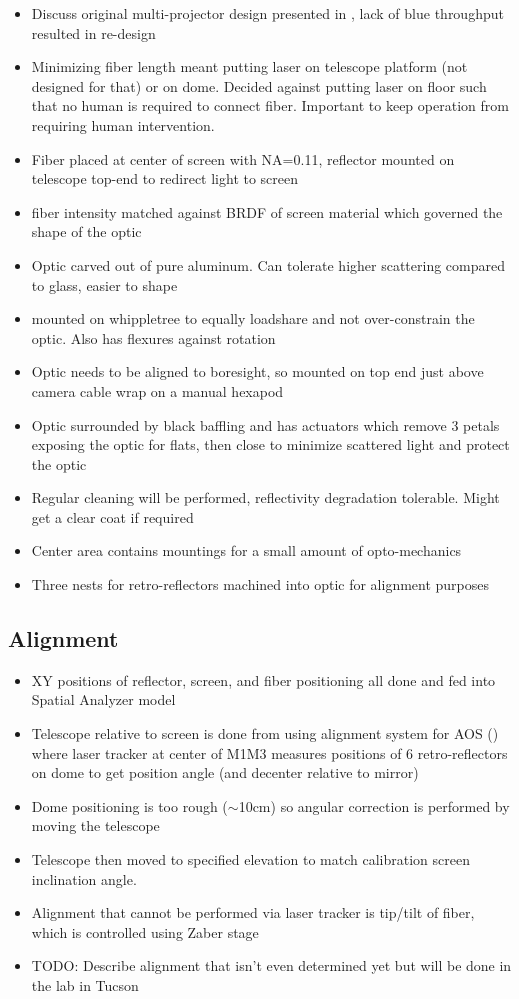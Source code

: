 \begin{itemize}
	\item Discuss original multi-projector design presented in \cite{Sebag2014}, lack of blue throughput resulted in re-design
	\item Minimizing fiber length meant putting laser on telescope platform (not designed for that) or on dome. Decided against putting laser on floor such that no human is required to connect fiber. Important to keep operation from requiring human intervention.
	\item Fiber placed at center of screen with NA=0.11, reflector mounted on telescope top-end to redirect light to screen
	\item fiber intensity matched against BRDF of screen material which governed the shape of the optic
	\item Optic carved out of pure aluminum. Can tolerate higher scattering compared to glass, easier to shape 
	\item mounted on whippletree to equally loadshare and not over-constrain the optic. Also has flexures against rotation
	\item Optic needs to be aligned to boresight, so mounted on top end just above camera cable wrap on a manual hexapod
	\item Optic surrounded by black baffling and has actuators which remove 3 petals exposing the optic for flats, then close to minimize scattered light and protect the optic
	\item Regular cleaning will be performed, reflectivity degradation tolerable. Might get a clear coat if required
	\item Center area contains mountings for a small amount of opto-mechanics 
	\item Three nests for retro-reflectors machined into optic for alignment purposes
\end{itemize}

\subsection{Alignment}

\begin{itemize}
	\item XY positions of reflector, screen, and fiber positioning all done and fed into Spatial Analyzer model
	\item Telescope relative to screen is done from using alignment system for AOS (\cite{PSTN-008}) where laser tracker at center of M1M3 measures positions of 6 retro-reflectors on dome to get position angle (and decenter relative to mirror)
	\item Dome positioning is too rough ($\sim$10cm) so angular correction is performed by moving the telescope
	\item Telescope then moved to specified elevation to match calibration screen inclination angle.
	\item Alignment that cannot be performed via laser tracker is tip/tilt of fiber, which is controlled using Zaber stage
	\item TODO: Describe alignment that isn't even determined yet but will be done in the lab in Tucson
\end{itemize}

